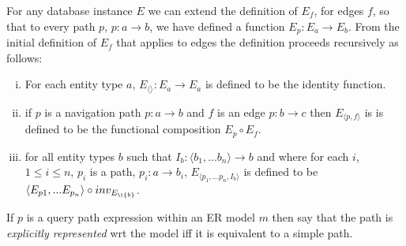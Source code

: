 \documentclass[10pt,a4paper]{article}
\newcommand{\genericmodel}{\mathcal{M}}
\renewcommand{\genericmodel}{{m}}
\newcommand{\term}[1]{\textit{{#1}}}
\begin{document}
\noindent For any database instance $E$ we can  extend  the definition of
$E_f$, for edges $f$,  so that to every path $p$, $p: a \rightarrow b$,  we have defined a function $E_p: E_a \rightarrow E_b$. From the initial definition of $E_f$ that applies to 
edges the definition proceeds recursively as follows: 
\begin{enumerate} [(i)]
\item{  For each entity type $a$, $E_{\langle \rangle}: E_a \rightarrow E_a$ is defined to be the identity function.
}

\item{   if $p$ is a navigation path $p: a \rightarrow b$ and $f$ is an edge $p: b \rightarrow c$ then $E_{\langle p,f \rangle}$ is 
is defined to be the functional composition $E_p \circ E_f$.
}

\item{ for all entity types $b$ such that $I_b: \langle b_1,...b_n\rangle \rightarrow b$ and where
for each $i$, $1 \leq i \leq n$, $p_i$ is a path, $p_i: a \rightarrow b_i$, $E_{\langle p_1,...p_n,I_b\rangle}$ is defined to be 
$\langle E_{p1},...E_{p_n} \rangle \circ inv_{E_{\i{b}}}$.
}
\end{enumerate}
\noindent If $p$ is a query path expression within an ER model $\genericmodel$ then say that the path is \term{explicitly represented} wrt the model iff it is equivalent to a simple path. \\
\end{document}
